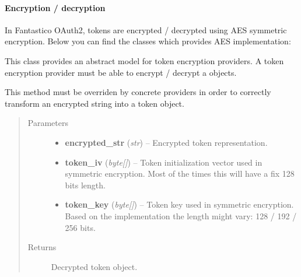 \documentclass[letterpaper,10pt,english]{sphinxmanual}
\begin{document}
\paragraph{Encryption / decryption}
\label{features/oauth2/technical_summary:encryption-decryption}
In Fantastico OAuth2, tokens are encrypted / decrypted using AES symmetric encryption. Below you can find the classes which provides
AES implementation:

\begin{fulllineitems}
\label{features/oauth2/technical_summary:fantastico.oauth2.token_encryption.TokenEncryption}
This class provides an abstract model for token encryption providers. A token encryption provider must be able
to encrypt / decrypt a {\hyperref[features/oauth2/technical_summary:fantastico.oauth2.token.Token]{}} objects.

\begin{fulllineitems}
\label{features/oauth2/technical_summary:fantastico.oauth2.token_encryption.TokenEncryption.decrypt_token}
This method must be overriden by concrete providers in order to correctly transform an encrypted string into a token
object.
\begin{quote}\begin{description}
\item[{Parameters}] \leavevmode\begin{itemize}
\item {} 
\textbf{encrypted\_str} (\emph{str}) -- Encrypted token representation.

\item {} 
\textbf{token\_iv} (\emph{byte{[}{]}}) -- Token initialization vector used in symmetric encryption. Most of the times this will have a fix 128 bits length.

\item {} 
\textbf{token\_key} (\emph{byte{[}{]}}) -- Token key used in symmetric encryption. Based on the implementation the length might vary: 128 / 192 / 256 bits.

\end{itemize}

\item[{Returns}] \leavevmode
Decrypted token object.


\end{description}
\end{quote}
\end{fulllineitems}
\end{fulllineitems}
\end{document}
